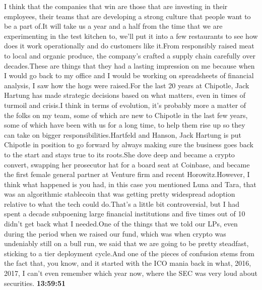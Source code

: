 \documentclass{article}%
\begin{document}
I think that the companies that win are those that are investing in their employees, their teams that are developing a strong culture that people want to be a part of.It will take us a year and a half from the time that we are experimenting in the test kitchen to, we'll put it into a few restaurants to see how does it work operationally and do customers like it.From responsibly raised meat to local and organic produce, the company's crafted a supply chain carefully over decades.These are things that they had a lasting impression on me because when I would go back to my office and I would be working on spreadsheets of financial analysis, I saw how the hogs were raised.For the last 20 years at Chipotle, Jack Hartung has made strategic decisions based on what matters, even in times of turmoil and crisis.I think in terms of evolution, it's probably more a matter of the folks on my team, some of which are new to Chipotle in the last few years, some of which have been with us for a long time, to help them rise up so they can take on bigger responsibilities.Hartfeld and Hanson, Jack Hartung is put Chipotle in position to go forward by always making sure the business goes back to the start and stays true to its roots.She dove deep and became a crypto convert, swapping her prosecutor hat for a board seat at Coinbase, and became the first female general partner at Venture firm and recent Horowitz.However, I think what happened is you had, in this case you mentioned Luna and Tara, that was an algorithmic stablecoin that was getting pretty widespread adoption relative to what the tech could do.That's a little bit controversial, but I had spent a decade subpoening large financial institutions and five times out of 10 didn't get back what I needed.One of the things that we told our LPs, even during the period when we raised our fund, which was when crypto was undeniably still on a bull run, we said that we are going to be pretty steadfast, sticking to a tier deployment cycle.And one of the pieces of confusion stems from the fact that, you know, and it started with the ICO mania back in what, 2016, 2017, I can't even remember which year now, where the SEC was very loud about securities.%
\textbf{13:59:51}%
\newline%
\end{document}
